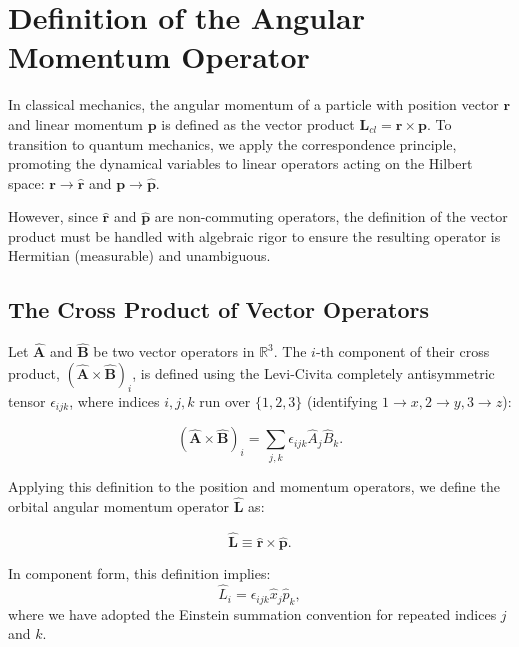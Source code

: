 \section{Definition of the Angular Momentum Operator}

In classical mechanics, the angular momentum of a particle with position vector $\mathbf{r}$ and linear momentum $\mathbf{p}$ is defined as the vector product $\mathbf{L}_{cl} = \mathbf{r} \times \mathbf{p}$. To transition to quantum mechanics, we apply the correspondence principle, promoting the dynamical variables to linear operators acting on the Hilbert space: $\mathbf{r} \to \hat{\mathbf{r}}$ and $\mathbf{p} \to \hat{\mathbf{p}}$.

However, since $\hat{\mathbf{r}}$ and $\hat{\mathbf{p}}$ are non-commuting operators, the definition of the vector product must be handled with algebraic rigor to ensure the resulting operator is Hermitian (measurable) and unambiguous.

\subsection{The Cross Product of Vector Operators}

Let $\hat{\mathbf{A}}$ and $\hat{\mathbf{B}}$ be two vector operators in $\mathbb{R}^3$. The $i$-th component of their cross product, $(\hat{\mathbf{A}} \times \hat{\mathbf{B}})_i$, is defined using the Levi-Civita completely antisymmetric tensor $\epsilon_{ijk}$, where indices $i, j, k$ run over $\{1, 2, 3\}$ (identifying $1\to x, 2\to y, 3\to z$):

\begin{equation}
    (\hat{\mathbf{A}} \times \hat{\mathbf{B}})_i = \sum_{j,k} \epsilon_{ijk} \hat{A}_j \hat{B}_k.
\end{equation}

Applying this definition to the position and momentum operators, we define the orbital angular momentum operator $\hat{\mathbf{L}}$ as:

\begin{equation}
    \hat{\mathbf{L}} \equiv \hat{\mathbf{r}} \times \hat{\mathbf{p}}.
\end{equation}

In component form, this definition implies:
\begin{equation} \label{eq:L_def_tensor}
    \hat{L}_i = \epsilon_{ijk} \hat{x}_j \hat{p}_k,
\end{equation}
where we have adopted the Einstein summation convention for repeated indices $j$ and $k$.

